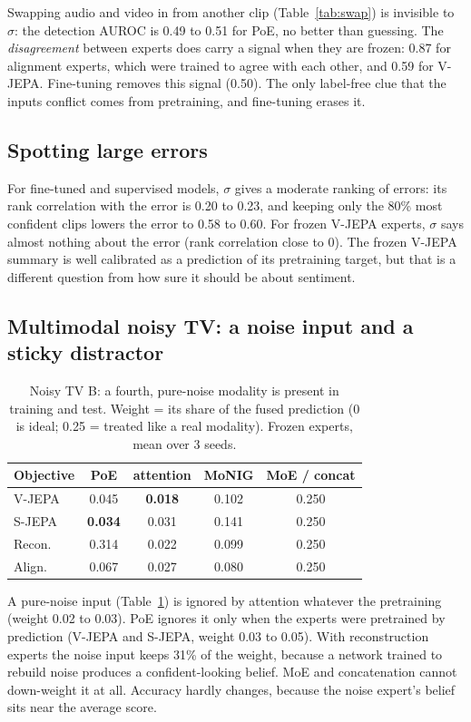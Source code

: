 \documentclass[10pt,twocolumn]{article}
\newcommand{\best}[1]{\textbf{#1}}
\newcommand{\worst}[1]{\textcolor{red!70!black}{#1}}
\begin{document}
Swapping audio and video in from another clip (Table~\ref{tab:swap}) is invisible to $\sigma$: the detection AUROC is 0.49
to 0.51 for PoE, no better than guessing. The \emph{disagreement} between experts does carry a signal when they are
frozen: 0.87 for alignment experts, which were trained to agree with each other, and 0.59 for V-JEPA. Fine-tuning removes
this signal (0.50). The only label-free clue that the inputs conflict comes from pretraining, and fine-tuning erases it.

\subsection{Spotting large errors}
For fine-tuned and supervised models, $\sigma$ gives a moderate ranking of errors: its rank correlation with the error is
0.20 to 0.23, and keeping only the 80\% most confident clips lowers the error to 0.58 to 0.60. For frozen V-JEPA experts,
$\sigma$ says almost nothing about the error (rank correlation close to 0). The frozen V-JEPA summary is well calibrated
as a prediction of its pretraining target, but that is a different question from how sure it should be about sentiment.

\subsection{Multimodal noisy TV: a noise input and a sticky distractor}
\begin{table}[t]
\centering\small
\caption{Noisy TV B: a fourth, pure-noise modality is present in training and test. Weight = its share of the
fused prediction (0 is ideal; 0.25 = treated like a real modality). Frozen experts, mean over 3 seeds.}
\label{tab:noisech}
\setlength{\tabcolsep}{4pt}
\begin{tabular}{lcccc}
\toprule
Objective & PoE & attention & MoNIG & MoE / concat\\
\midrule
V-JEPA & 0.045 & \best{0.018} & 0.102 & \worst{0.250}\\
S-JEPA & \best{0.034} & 0.031 & 0.141 & \worst{0.250}\\
Recon. & \worst{0.314} & 0.022 & 0.099 & \worst{0.250}\\
Align. & 0.067 & 0.027 & 0.080 & \worst{0.250}\\
\bottomrule
\end{tabular}
\end{table}

A pure-noise input (Table~\ref{tab:noisech}) is ignored by attention whatever the pretraining (weight 0.02 to
0.03). PoE ignores it only when the experts were pretrained by prediction (V-JEPA and S-JEPA, weight 0.03 to 0.05). With
reconstruction experts the noise input keeps 31\% of the weight, because a network trained to rebuild noise produces a
confident-looking belief. MoE and concatenation cannot down-weight it at all. Accuracy hardly changes, because the noise
expert's belief sits near the average score.
\end{document}
